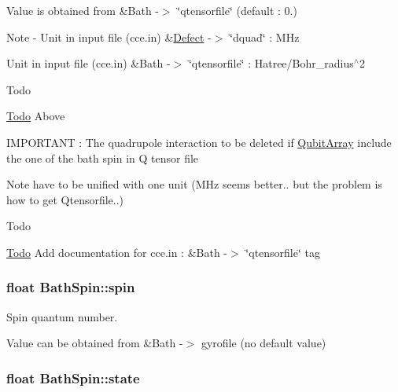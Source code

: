 Value is obtained from \&Bath -\/$>$ \char`\"{}qtensorfile\char`\"{} (default \-: 0.) \begin{DoxyNote}{Note}
-\/ Unit in input file (cce.\-in) \&\hyperlink{structDefect}{Defect} -\/$>$ \char`\"{}dquad\char`\"{} \-: M\-Hz
\begin{DoxyItemize}
\item Unit in input file (cce.\-in) \&Bath -\/$>$ \char`\"{}qtensorfile\char`\"{} \-: Hatree/\-Bohr\-\_\-radius$^\wedge$2 
\end{DoxyItemize}
\end{DoxyNote}
\begin{DoxyRefDesc}{Todo}
\item[\hyperlink{todo__todo000009}{Todo}]Above 

I\-M\-P\-O\-R\-T\-A\-N\-T \-: The quadrupole interaction to be deleted if \hyperlink{structQubitArray}{Qubit\-Array} include the one of the bath spin in Q tensor file \end{DoxyRefDesc}
\begin{DoxyNote}{Note}
have to be unified with one unit (M\-Hz seems better.. but the problem is how to get Qtensorfile..) 
\end{DoxyNote}
\begin{DoxyRefDesc}{Todo}
\item[\hyperlink{todo__todo000010}{Todo}]Add documentation for cce.\-in \-: \&Bath -\/$>$ \char`\"{}qtensorfile\char`\"{} tag \end{DoxyRefDesc}
\hypertarget{structBathSpin_a0738a356e1f78530032d8bc8de02fbd8}{
\subsubsection[{spin}]{\setlength{\rightskip}{0pt plus 5cm}float Bath\-Spin\-::spin}}\label{structBathSpin_a0738a356e1f78530032d8bc8de02fbd8}


Spin quantum number. 

Value can be obtained from \&Bath -\/$>$ gyrofile (no default value) \hypertarget{structBathSpin_a6348f965fe820b03094f4c620ab7ffe0}{
\subsubsection[{state}]{\setlength{\rightskip}{0pt plus 5cm}float Bath\-Spin\-::state}}\label{structBathSpin_a6348f965fe820b03094f4c620ab7ffe0}


